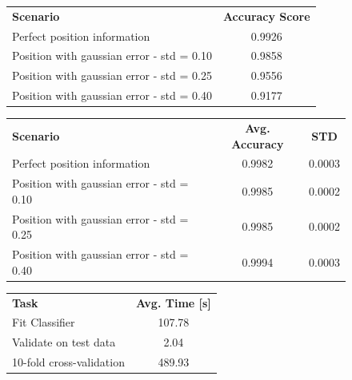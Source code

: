 \documentclass{kthreport}
\theoremstyle{definition}
\begin{document}
\begin{figure}[tb]
        \centering
        \begin{tabular}{|l|c|}
            \hline 
            \textbf{Scenario} & \textbf{Accuracy Score} \\ 
            Perfect position information & \num{0.9926} \\ 
            Position with gaussian error - std = \num{0.10} & \num{0.9858} \\ 
            Position with gaussian error - std = \num{0.25} & \num{0.9556} \\ 
            Position with gaussian error - std = \num{0.40} & \num{0.9177} \\ 
            \hline 
        \end{tabular}
        \label{tbl:accuracy}%
        \bigskip%
        \begin{tabular}{|l|c|c|}
            \hline 
            \textbf{Scenario} & \textbf{Avg. Accuracy} & \textbf{STD} \\ 
            Perfect position information & \num{0.9982} & \num{0.0003} \\ 
            Position with gaussian error - std = \num{0.10} & \num{0.9985} & \num{0.0002} \\ 
            Position with gaussian error - std = \num{0.25} & \num{0.9985} & \num{0.0002} \\ 
            Position with gaussian error - std = \num{0.40} & \num{0.9994} & \num{0.0003} \\ 
            \hline 
        \end{tabular}
        \label{tbl:10foldcv}%
        \bigskip%
        \begin{tabular}{|l|c|}
            \hline
            \textbf{Task} & \textbf{Avg. Time [s]}\\ 
            Fit Classifier & \num{107.78} \\ 
            Validate on test data & \num{2.04} \\ 
            10-fold cross-validation & \num{489.93} \\ 
            \hline 
        \end{tabular} 
        \label{tbl:runtime}
\end{figure}
\end{document}
